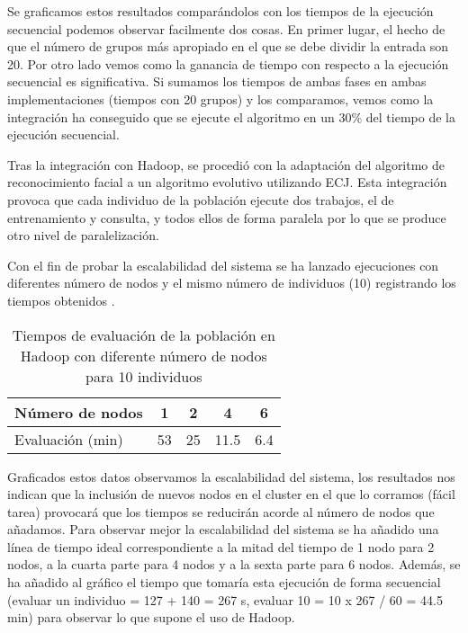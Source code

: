 Se graficamos estos resultados  compar\'andolos con los tiempos de la ejecuci\'on secuencial podemos observar facilmente dos cosas. En primer lugar, el hecho de que el n\'umero de grupos m\'as apropiado en el que se debe dividir la entrada son 20. Por otro lado vemos como la ganancia de tiempo con respecto a la ejecuci\'on secuencial es significativa. Si sumamos los tiempos de ambas fases en ambas implementaciones (tiempos con 20 grupos) y los comparamos, vemos como la integraci\'on ha conseguido que se ejecute el algoritmo en un 30\% del tiempo de la ejecuci\'on secuencial.


Tras la integraci\'on con Hadoop, se procedi\'o con la adaptaci\'on del algoritmo de reconocimiento facial a un algoritmo evolutivo utilizando ECJ. Esta integraci\'on provoca que cada individuo de la poblaci\'on ejecute dos trabajos, el de entrenamiento y consulta, y todos ellos de forma paralela por lo que se produce otro nivel de paralelizaci\'on. 

Con el fin de probar la escalabilidad del sistema se ha lanzado ejecuciones con diferentes n\'umero de nodos y el mismo n\'umero de individuos (10) registrando los tiempos obtenidos .

\begin{table}[H]
  \begin{center}
    \begin{center}
    \begin{tabular}{l | c c c c}
    N\'umero de nodos & 1 & 2 & 4 & 6 \\ \hline
    Evaluaci\'on (min) & 53 & 25 & 11.5 & 6.4\\
    \end{tabular}
    \end{center}
    \caption{Tiempos de evaluaci\'on de la poblaci\'on en Hadoop con diferente n\'umero de nodos para 10 individuos}
    \label{tabla-dif-num-nodos}
  \end{center}
\end{table}


Graficados estos datos  observamos la escalabilidad del sistema, los resultados nos indican que la inclusi\'on de nuevos nodos en el cluster en el que lo corramos (f\'acil tarea) provocar\'a que los tiempos se reducir\'an acorde al n\'umero de nodos que a\~nadamos. Para observar mejor la escalabilidad del sistema se ha a\~nadido una l\'inea de tiempo ideal correspondiente a la mitad del tiempo de 1 nodo para 2 nodos, a la cuarta parte para 4 nodos y a la sexta parte para 6 nodos. Adem\'as, se ha a\~nadido al gr\'afico el tiempo que tomar\'ia esta ejecuci\'on de forma secuencial (evaluar un individuo {= 127 + 140 = 267 s}, evaluar 10 {= 10 x 267 / 60 = 44.5 min}) para observar lo que supone el uso de Hadoop.


